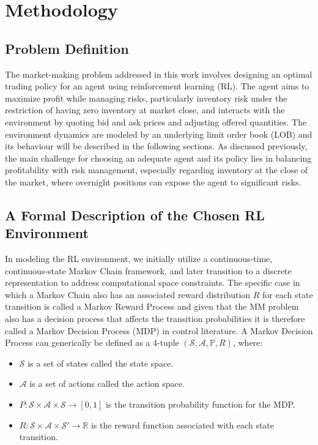 \section{Methodology}
\label{sec:methodology}

\subsection{Problem Definition}
\label{subsec:problem-definition}
The market-making problem addressed in this work involves designing an optimal trading policy for an agent using reinforcement learning (RL).
The agent aims to maximize profit while managing risks, particularly inventory risk under the restriction of having zero inventory at market close,
and interacts with the environment by quoting bid and ask prices and adjusting offered quantities.
The environment dynamics are modeled by an underlying limit order book (LOB) and its behaviour will be described in the following sections.
As discussed previously, the main challenge for choosing an adequate agent and its policy lies in balancing profitability with risk management,
especially regarding inventory at the close of the market, where overnight positions can expose the agent to significant risks.

\subsection{A Formal Description of the Chosen RL Environment}
\label{subsec:formal-description-of-the-rl-environment}
In modeling the RL environment, we initially utilize a continuous-time, continuous-state Markov Chain framework,
and later transition to a discrete representation to address computational space constraints.
The specific case in which a Markov Chain also has an associated reward distribution $R$ for each state transition is called a Markov Reward Process
and given that the MM problem also has a decision process that affects the transition probabilities it is therefore called a Markov Decision Process (MDP) in control literature.
A Markov Decision Process can generically be defined as a 4-tuple $ (\mathcal{S}, \mathcal{A}, \mathbb{P}, R) $, where:

\begin{itemize}
    \item $\mathcal{S}$ is a set of states called the state space.
    \item $\mathcal{A}$ is a set of actions called the action space.
    \item $P: \mathcal{S} \times \mathcal{A} \times \mathcal{S} \to [0, 1]$ is the transition probability function for the MDP.
    \item $R: \mathcal{S} \times \mathcal{A} \times \mathcal{S}' \rightarrow \mathbb{R}$ is the reward function associated with each state transition.
\end{itemize}

